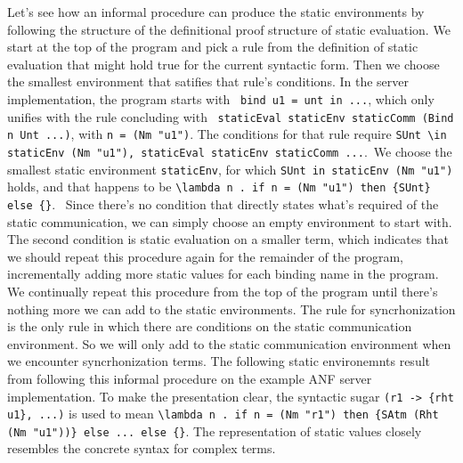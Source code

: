 \documentclass[letterpaper, 11pt]{extarticle}
\begin{document}
Let's see how an informal procedure can produce the static environments by following the
structure of the definitional proof structure of static evaluation.
We start at the top of the program and pick a
rule from the definition of static evaluation that might hold true for the current syntactic form.
Then we choose the smallest environment that satifies that rule's conditions. 
In the server implementation, the program starts with \
\lstinline[language=normal_lang, mathescape]{bind u1 = unt in ...}, which only unifies with 
the rule concluding with \
\lstinline[language=logic, mathescape]{staticEval staticEnv staticComm (Bind n Unt ...)},
with \lstinline[language=logic, mathescape]{n = (Nm "u1")}. 
The conditions for that rule require 
\lstinline[language=logic, mathescape]{SUnt \in staticEnv (Nm "u1"), staticEval staticEnv staticComm ...}.\
We choose the smallest static environment \lstinline{staticEnv}, for which
\lstinline[language=logic]{SUnt in staticEnv (Nm "u1")} holds, and that happens to be 
\lstinline[language=logic]|\lambda n . if n = (Nm "u1") then {SUnt} else {}|. \
Since there's no condition that directly states what's required of the static communication, we can
simply choose an empty environment to start with. The second condition is static evaluation on
a smaller term, which indicates that we should repeat this procedure again for the remainder of
the program, incrementally adding more static values for each binding name in the program.
We continually repeat this procedure from the top of the program until there's
nothing more we can add to the static environments.
The rule for syncrhonization is the only rule in which there are conditions on
the static communication environment. So we will only add to the static communication
environment when we encounter syncrhonization terms.
The following static environemnts result from following this informal procedure on
the example ANF server implementation.
To make the presentation clear, the syntactic sugar \lstinline|(r1 -> {rht u1}, ...)| is used 
to mean \lstinline[language=logic]|\lambda n . if n = (Nm "r1") then {SAtm (Rht (Nm "u1"))} else ... else {}|.
The representation of static values closely resembles the concrete syntax for complex terms.
\end{document}
